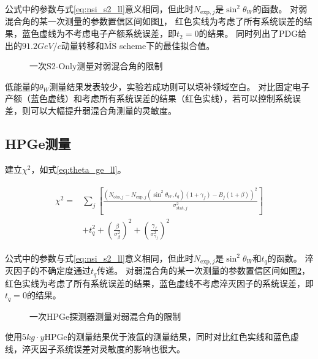 公式中的参数与式\ref{eq:nsi_s2_ll}意义相同，但此时$N_{\mathrm{exp},j}$是$\sin^2\theta_W$的函数。
对弱混合角的某一次测量的参数置信区间如图\ref{fig:thetaw_sensitivity_s2only}，
红色实线为考虑了所有系统误差的结果，蓝色虚线为不考虑电子产额系统误差，即$t_2=0$的结果。
同时列出了PDG给出的$91.2\si{GeV/c}$动量转移和$\overline{\mathrm{MS}}$ scheme下的最佳拟合值\cite{particle_data_group_review_2020}。

\begin{figure}
  \centering
  
  \caption{\label{fig:thetaw_sensitivity_s2only} 一次S2-Only测量对弱混合角的限制}
\end{figure}

低能量的$\theta_W$测量结果发表较少，实验若成功则可以填补领域空白。
对比固定电子产额（蓝色虚线）和考虑所有系统误差的结果（红色实线），若可以控制系统误差，则可以大幅提升弱混合角测量的灵敏度。

\subsection{HPGe测量}

建立$\chi^2$，如式\ref{eq:theta_ge_ll}。

\begin{align}
    \label{eq:theta_ge_ll}
    \begin{split}
    \chi^2 =& \sum_j\left[\frac{\left(N_{\mathrm{obs},j} - N_{\mathrm{exp},j}(\sin^2\theta_W, t_q)(1 + \gamma_f) 
    - B_{j}(1 + \beta)\right)^2}{\sigma^2_{\mathrm{stat},j}}\right] \\
    & + t_q^2 + (\frac{\beta}{\sigma^2_{\beta}})^2 + (\frac{\gamma_f}{\sigma^2_{\gamma_f}})^2
    \end{split}
\end{align}

公式中的参数与式\ref{eq:nsi_s2_ll}意义相同，但此时$N_{\mathrm{exp},j}$是$\sin^2\theta_W$和$t_q$的函数。
淬灭因子的不确定度通过$t_q$传递。
对弱混合角的某一次测量的参数置信区间如图\ref{fig:thetaw_sensitivity_ge}，
红色实线为考虑了所有系统误差的结果，蓝色虚线不考虑淬灭因子的系统误差，即$t_q=0$的结果。

\begin{figure}
    \centering
    
    \caption{\label{fig:thetaw_sensitivity_ge} 一次HPGe探测器测量对弱混合角的限制}
\end{figure}

使用$5\si{kg\cdot y}$HPGe的测量结果优于液氙的测量结果，同时对比红色实线和蓝色虚线，淬灭因子系统误差对灵敏度的影响也很大。

